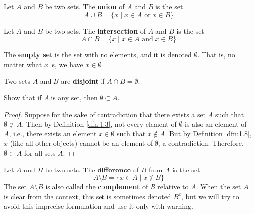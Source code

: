 \documentclass[../main.tex]{subfiles}
\begin{document}
\begin{definition}\label{dfn:1.5}
    Let $A$ and $B$ be two sets. The \textbf{union} of $A$ and $B$ is the set
    \begin{equation*}
        A\cup B = \{x\mid x\in A\text{ or }x\in B\}
    \end{equation*}
\end{definition}

\begin{definition}\label{dfn:1.6}
    Let $A$ and $B$ be two sets. The \textbf{intersection} of $A$ and $B$ is the set
    \begin{equation*}
        A\cap B = \{x\mid x\in A\text{ and }x\in B\}
    \end{equation*}
\end{definition}


\begin{definition}\label{dfn:1.8}
    The \textbf{empty set} is the set with no elements, and it is denoted $\emptyset$. That is, no matter what $x$ is, we have $x\in\emptyset$.
\end{definition}

\begin{definition}\label{dfn:1.9}
    Two sets $A$ and $B$ are \textbf{disjoint} if $A\cap B=\emptyset$.
\end{definition}

\begin{exercise}\label{exr:1.10}
    Show that if $A$ is any set, then $\emptyset\subset A$.
    \begin{proof}
        Suppose for the sake of contradiction that there exists a set $A$ such that $\emptyset\not\subset A$. Then by Definition \ref{dfn:1.3}, not every element of $\emptyset$ is also an element of $A$, i.e., there exists an element $x\in\emptyset$ such that $x\notin A$. But by Definition \ref{dfn:1.8}, $x$ (like all other objects) cannot be an element of $\emptyset$, a contradiction. Therefore, $\emptyset\subset A$ for all sets $A$.
    \end{proof}
\end{exercise}

\begin{definition}\label{dfn:1.11}
    Let $A$ and $B$ be two sets. The \textbf{difference} of $B$ from $A$ is the set
    \begin{equation*}
        A\setminus B = \{x\in A\mid x\notin B\}
    \end{equation*}
    The set $A\setminus B$ is also called the \textbf{complement} of $B$ relative to $A$. When the set $A$ is clear from the context, this set is sometimes denoted $B^c$, but we will try to avoid this imprecise formulation and use it only with warning.
\end{definition}
\end{document}
